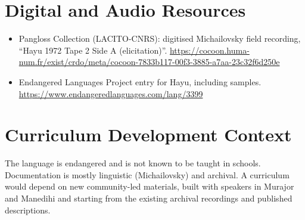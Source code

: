 \documentclass[12pt]{article}
\begin{document}
\section{Digital and Audio Resources}
\begin{itemize}
\item Pangloss Collection (LACITO-CNRS): digitised Michailovsky field recording, ``Hayu 1972 Tape 2 Side A (elicitation)''. \url{https://cocoon.huma-num.fr/exist/crdo/meta/cocoon-7833b117-00f3-3885-a7aa-23c32f6d250e}
\item Endangered Languages Project entry for Hayu, including samples. \url{https://www.endangeredlanguages.com/lang/3399}
\end{itemize}

\section{Curriculum Development Context}
The language is endangered and is not known to be taught in schools. Documentation is mostly linguistic (Michailovsky) and archival. A curriculum would depend on new community-led materials, built with speakers in Murajor and Manedihi and starting from the existing archival recordings and published descriptions.
\end{document}
